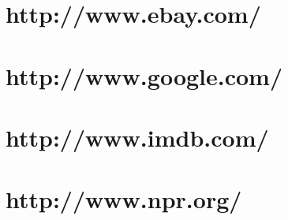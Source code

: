 \documentclass{article}
\begin{document}








\section{http://www.ebay.com/}














\section{http://www.google.com/}














\section{http://www.imdb.com/}














\section{http://www.npr.org/}










\end{document}
